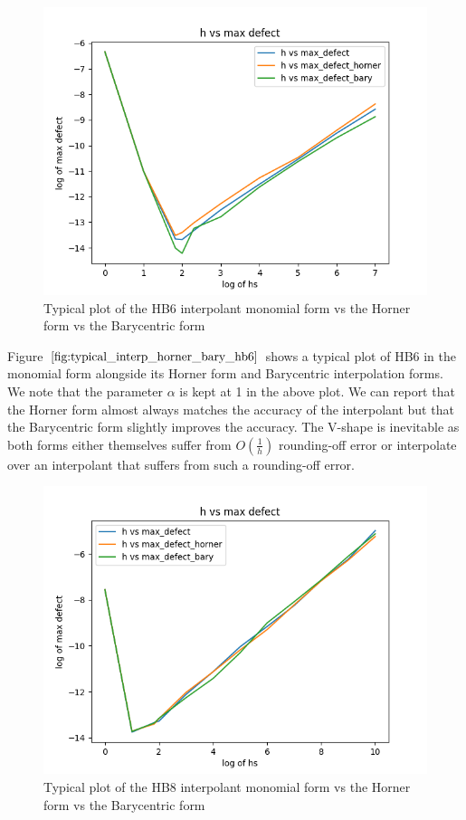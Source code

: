 \begin{figure}[H]
\centering
\includegraphics[width=0.7\linewidth]{./figures/typical_interp_horner_bary_hb6}
\caption{Typical plot of the HB6 interpolant monomial form vs the Horner form vs the Barycentric form}
\label{fig:typical_interp_horner_bary_hb6}
\end{figure}

Figure $\ref{fig:typical_interp_horner_bary_hb6}$ shows a typical plot of HB6 in the monomial form alongside its Horner form and Barycentric interpolation forms. We note that the parameter $\alpha$ is kept at 1 in the above plot. We can report that the Horner form almost always matches the accuracy of the interpolant but that the Barycentric form slightly improves the accuracy. The V-shape is inevitable as both forms either themselves suffer from $O(\frac{1}{h})$ rounding-off error or interpolate over an interpolant that suffers from such a rounding-off error.

\begin{figure}[H]
\centering
\includegraphics[width=0.7\linewidth]{./figures/typical_interp_horner_bary_hb8}
\caption{Typical plot of the HB8 interpolant monomial form vs the Horner form vs the Barycentric form}
\label{fig:typical_interp_horner_bary_hb8}
\end{figure}

